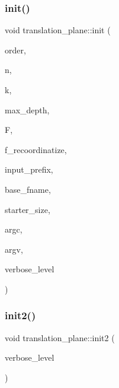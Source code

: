 \subsubsection{\texorpdfstring{init()}{init()}}
{\footnotesize\ttfamily void translation\+\_\+plane\+::init (\begin{DoxyParamCaption}\item[{\mbox{\hyperlink{galois_8h_a09fddde158a3a20bd2dcadb609de11dc}{I\+NT}}}]{order,  }\item[{\mbox{\hyperlink{galois_8h_a09fddde158a3a20bd2dcadb609de11dc}{I\+NT}}}]{n,  }\item[{\mbox{\hyperlink{galois_8h_a09fddde158a3a20bd2dcadb609de11dc}{I\+NT}}}]{k,  }\item[{\mbox{\hyperlink{galois_8h_a09fddde158a3a20bd2dcadb609de11dc}{I\+NT}}}]{max\+\_\+depth,  }\item[{\mbox{\hyperlink{classfinite__field}{finite\+\_\+field}} $\ast$}]{F,  }\item[{\mbox{\hyperlink{galois_8h_a09fddde158a3a20bd2dcadb609de11dc}{I\+NT}}}]{f\+\_\+recoordinatize,  }\item[{const \mbox{\hyperlink{galois_8h_ab6cc7b4aeb6ea31aba2b3fbfc83ff5e6}{B\+Y\+TE}} $\ast$}]{input\+\_\+prefix,  }\item[{const \mbox{\hyperlink{galois_8h_ab6cc7b4aeb6ea31aba2b3fbfc83ff5e6}{B\+Y\+TE}} $\ast$}]{base\+\_\+fname,  }\item[{\mbox{\hyperlink{galois_8h_a09fddde158a3a20bd2dcadb609de11dc}{I\+NT}}}]{starter\+\_\+size,  }\item[{int}]{argc,  }\item[{const char $\ast$$\ast$}]{argv,  }\item[{\mbox{\hyperlink{galois_8h_a09fddde158a3a20bd2dcadb609de11dc}{I\+NT}}}]{verbose\+\_\+level }\end{DoxyParamCaption})}

\mbox{\label{classtranslation__plane_a28ae6a7fcae342c3c802a67e4bf2fa43}} 
\subsubsection{\texorpdfstring{init2()}{init2()}}
{\footnotesize\ttfamily void translation\+\_\+plane\+::init2 (\begin{DoxyParamCaption}\item[{\mbox{\hyperlink{galois_8h_a09fddde158a3a20bd2dcadb609de11dc}{I\+NT}}}]{verbose\+\_\+level }\end{DoxyParamCaption})}

